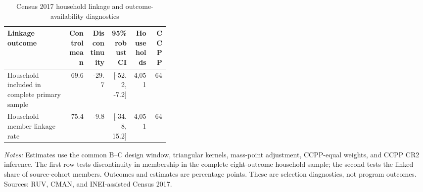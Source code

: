 \begin{table}[!htbp]
\centering
\small
\caption{Census 2017 household linkage and outcome-availability diagnostics}
\label{tab:rd_outcomes_linkage_2017_household}
\begin{tabular}{p{0.38\linewidth}rrrrr}
\toprule
Linkage outcome & Control mean & Discontinuity & 95\% robust CI & Households & CCPP \\
\midrule
Household included in complete primary sample & 69.6 & -29.7 & [-52.2, -7.2] & 4,051 & 64 \\
Household member linkage rate & 75.4 & -9.8 & [-34.8, 15.2] & 4,051 & 64 \\
\bottomrule
\end{tabular}
\parbox{0.97\linewidth}{\footnotesize \textit{Notes:} Estimates use the common B--C design window, triangular kernels, mass-point adjustment, CCPP-equal weights, and CCPP CR2 inference. The first row tests discontinuity in membership in the complete eight-outcome household sample; the second tests the linked share of source-cohort members. Outcomes and estimates are percentage points. These are selection diagnostics, not program outcomes. Sources: RUV, CMAN, and INEI-assisted Census 2017.}
\end{table}
